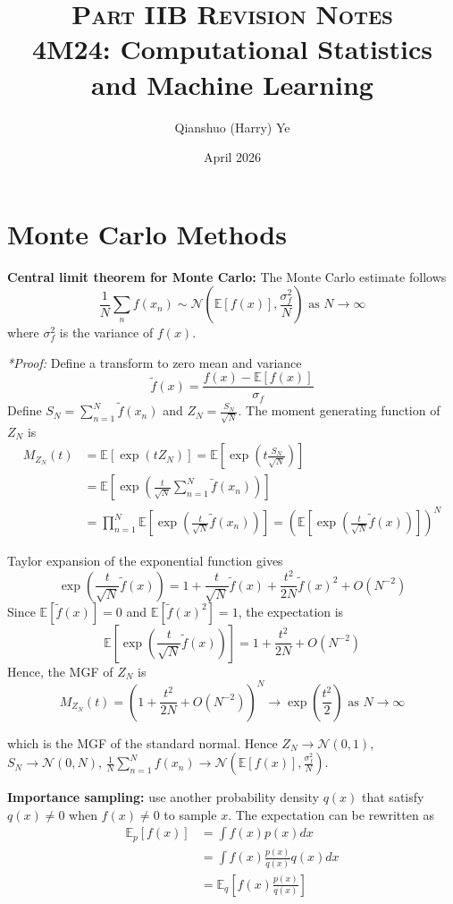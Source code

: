 \documentclass[12pt]{article}
\title{
    {\scshape  Part IIB Revision Notes} \\ 
    \vspace{0.5em}
    \textbf{\fontsize{18}{22}\selectfont 4M24: Computational Statistics and Machine Learning}}
\author{Qianshuo (Harry) Ye}
\date{April 2026}
\begin{document}
\maketitle

\section{Monte Carlo Methods}
\textbf{Central limit theorem for Monte Carlo:} The Monte Carlo estimate follows
$$
\frac{1}{N}\sum_n f(x_n) \sim \mathcal{N}\left( \mathbb{E}[f(x)], \frac{\sigma_f^2}{N} \right) \text{ as } N \to \infty
$$
where $\sigma_f^2$ is the variance of $f(x)$.

\textit{*Proof:} Define a transform to zero mean and variance
$$
\tilde{f}(x) = \frac{f(x) - \mathbb{E}[f(x)]}{\sigma_f}
$$
Define $S_N = \sum_{n=1}^N \tilde{f}(x_n)$ and $Z_N = \frac{S_N}{\sqrt{N}}$.
The moment generating function of $Z_N$ is 
\begin{align*}
M_{Z_N}(t) &= \mathbb{E}[\exp(t Z_N)] = \mathbb{E}\left[ \exp\left(t \frac{S_N}{\sqrt{N}}\right)\right] \\
&= \mathbb{E}\left[ \exp\left(\frac{t}{\sqrt{N}} \sum_{n=1}^N \tilde{f}(x_n)\right)\right] \\
&= \prod_{n=1}^N \mathbb{E}\left[ \exp\left(\frac{t}{\sqrt{N}} \tilde{f}(x_n)\right)\right] = \left( \mathbb{E}\left[ \exp\left(\frac{t}{\sqrt{N}} \tilde{f}(x)\right)\right] \right)^N
\end{align*}

Taylor expansion of the exponential function gives
$$
\exp\left(\frac{t}{\sqrt{N}} \tilde{f}(x)\right) = 1 + \frac{t}{\sqrt{N}} \tilde{f}(x) + \frac{t^2}{2N} \tilde{f}(x)^2 + O(N^{-2})
$$
Since $\mathbb{E}[\tilde{f}(x)] = 0$ and $\mathbb{E}[\tilde{f}(x)^2] = 1$, the expectation is
$$
\mathbb{E}\left[ \exp\left(\frac{t}{\sqrt{N}} \tilde{f}(x)\right)\right] = 1 + \frac{t^2}{2N} + O(N^{-2})
$$
Hence, the MGF of $Z_N$ is
$$
M_{Z_N}(t) = \left( 1 + \frac{t^2}{2N} + O(N^{-2}) \right)^N \to \exp\left(\frac{t^2}{2}\right) \text{ as } N \to \infty
$$

which is the MGF of the standard normal. Hence $Z_N \to \mathcal{N}(0, 1)$, $S_N \to \mathcal{N}(0, N)$, $\frac{1}{N} \sum_{n=1}^N f(x_n) \to \mathcal{N}(\mathbb{E}[f(x)], \frac{\sigma_f^2}{N})$.

\textbf{Importance sampling:} use another probability density $q(x)$ that satisfy $q(x) \neq 0$ when $f(x) \neq 0$ to sample $x$. The expectation can be rewritten as
\begin{align*}
    \mathbb{E}_p[f(x)] &= \int f(x) p(x) dx \\
    &= \int f(x) \frac{p(x)}{q(x)} q(x) dx \\
    &= \mathbb{E}_q \left[ f(x) \frac{p(x)}{q(x)} \right]
\end{align*}
\end{document}
